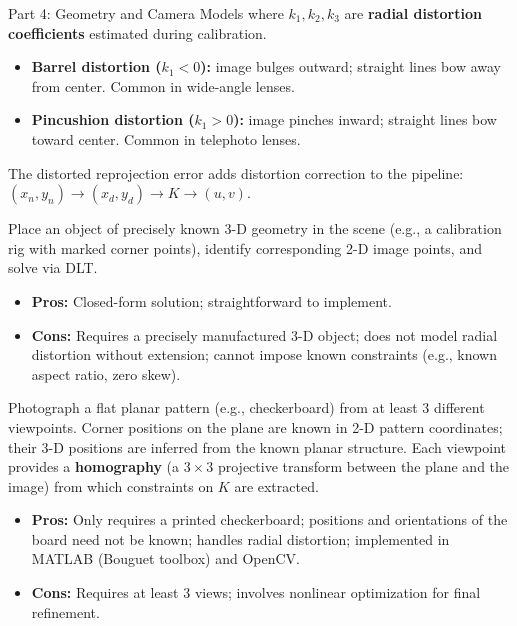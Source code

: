 \documentclass[letterpaper]{article}
\begin{document}
\begin{notes}{Part 4: Geometry and Camera Models}
where $k_1, k_2, k_3$ are \textbf{radial distortion coefficients}
estimated during calibration.

\begin{itemize}[noitemsep]
  \item \textbf{Barrel distortion ($k_1 < 0$):} image bulges outward;
        straight lines bow away from center.  Common in wide-angle lenses.
  \item \textbf{Pincushion distortion ($k_1 > 0$):} image pinches inward;
        straight lines bow toward center.  Common in telephoto lenses.
\end{itemize}

The distorted reprojection error adds distortion correction to the pipeline:
$(x_n, y_n) \to (x_d, y_d) \to K \to (u, v)$.



Place an object of precisely known 3-D geometry in the scene (e.g., a
calibration rig with marked corner points), identify corresponding 2-D
image points, and solve via DLT.

\begin{itemize}[noitemsep]
  \item \textbf{Pros:} Closed-form solution; straightforward to implement.
  \item \textbf{Cons:} Requires a precisely manufactured 3-D object;
        does not model radial distortion without extension; cannot impose
        known constraints (e.g., known aspect ratio, zero skew).
\end{itemize}


Photograph a flat planar pattern (e.g., checkerboard) from at least 3
different viewpoints.  Corner positions on the plane are known in 2-D
pattern coordinates; their 3-D positions are inferred from the known
planar structure.  Each viewpoint provides a \textbf{homography} (a
$3\times 3$ projective transform between the plane and the image) from
which constraints on $K$ are extracted.
\begin{itemize}[noitemsep]
  \item \textbf{Pros:} Only requires a printed checkerboard; positions
        and orientations of the board need not be known; handles radial
        distortion; implemented in MATLAB (Bouguet toolbox) and OpenCV.
  \item \textbf{Cons:} Requires at least 3 views; involves nonlinear
        optimization for final refinement.
\end{itemize}


\end{notes}
\end{document}
